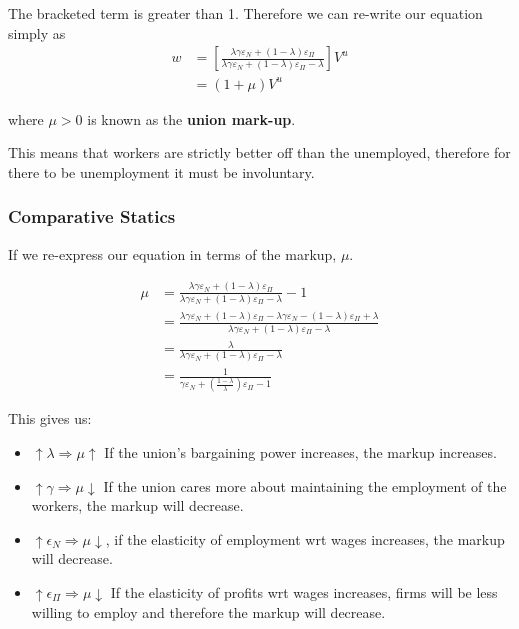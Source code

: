 \documentclass[11pt]{article}
\begin{document}
\begin{deriv}
\begin{note}
    The bracketed term is greater than 1. Therefore we can re-write our equation simply as
    \begin{equation}
\begin{aligned}
w & =\left[\frac{\lambda \gamma \varepsilon_N+(1-\lambda) \varepsilon_{\Pi}}{\lambda \gamma \varepsilon_N+(1-\lambda) \varepsilon_{\Pi}-\lambda}\right] V^u \\
& =(1+\mu) V^u
\end{aligned}
\end{equation}
\end{note}

where $\mu>0$ is known as the \textbf{union mark-up}.
\end{deriv}

This means that workers are strictly better off than the unemployed, therefore for there to be unemployment it must be involuntary.

\subsubsection{Comparative Statics}

If we re-express our equation in terms of the markup, $\mu$.

\begin{equation}
\begin{aligned}
\mu & =\frac{\lambda \gamma \varepsilon_N+(1-\lambda) \varepsilon_{\Pi}}{\lambda \gamma \varepsilon_N+(1-\lambda) \varepsilon_{\Pi}-\lambda}-1 \\
& =\frac{\lambda \gamma \varepsilon_N+(1-\lambda) \varepsilon_{\Pi}-\lambda \gamma \varepsilon_N-(1-\lambda) \varepsilon_{\Pi}+\lambda}{\lambda \gamma \varepsilon_N+(1-\lambda) \varepsilon_{\Pi}-\lambda} \\
& =\frac{\lambda}{\lambda \gamma \varepsilon_N+(1-\lambda) \varepsilon_{\Pi}-\lambda} \\
& =\frac{1}{\gamma \varepsilon_N+\left(\frac{1-\lambda}{\lambda}\right) \varepsilon_{\Pi}-1}
\end{aligned}
\end{equation}

This gives us:
\begin{itemize}
    \item $\uparrow\lambda\Rightarrow\mu\uparrow$ If the union's bargaining power increases, the markup increases.
    \item  $\uparrow\gamma\Rightarrow\mu\downarrow$ If the union cares more about maintaining the employment of the workers, the markup will decrease.
    \item $\uparrow\epsilon_N \Rightarrow\mu\downarrow$, if the elasticity of employment wrt wages increases, the markup will decrease. 
    \item $\uparrow\epsilon_\Pi\Rightarrow\mu\downarrow$ If the elasticity of profits wrt wages increases, firms will be less willing to employ and therefore the markup will decrease.
\end{itemize}
\end{document}

